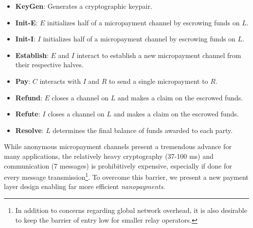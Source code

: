 \begin{itemize}[label={}]
\item \textbf{KeyGen}: Generates a cryptographic keypair.
\item \textbf{Init-E}: $E$ initializes half of a micropayment channel by
  escrowing funds on $L$.
\item \textbf{Init-I}: $I$ initializes half of a micropayment channel by
  escrowing funds on $L$.
\item \textbf{Establish}: $E$ and $I$ interact to establish a new micropayment
  channel from their respective halves.
\item \textbf{Pay}: $C$ interacts with $I$ and $R$ to send a single micropayment to $R$.
\item \textbf{Refund}: $E$ closes a channel on $L$ and makes a claim on
  the escrowed funds.
\item \textbf{Refute}: $I$ closes a channel on $L$ and makes a claim on
  the escrowed funds.
\item \textbf{Resolve}: $L$ determines the final balance of funds awarded to
  each party.
\end{itemize}

While anonymous micropayment channels present a tremendous advance for many applications, the relatively heavy cryptography (37-100 ms) and communication (7 messages) is prohibitively expensive, especially if done for every message transmission\footnote{In addition to concerns regarding global network overhead, it is also desirable to keep the barrier of entry low for smaller relay operators.}.
To overcome this barrier, we present a new payment layer design enabling far more efficient \emph{nanopayments}.

